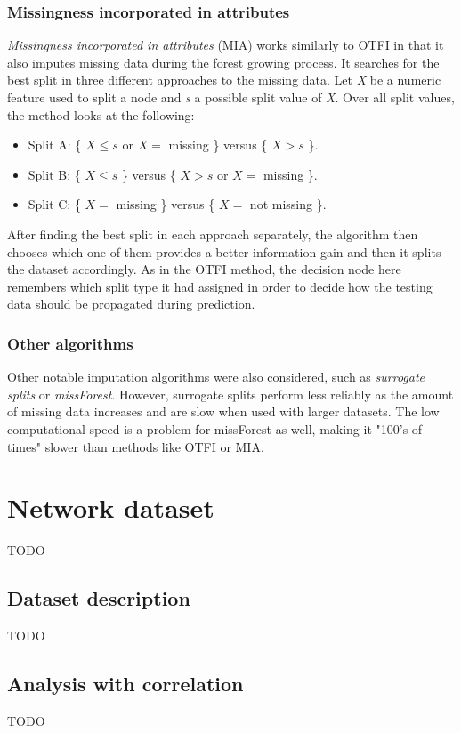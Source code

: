 \documentclass[11pt]{article}
\begin{document}
      \subsubsection{Missingness incorporated in attributes}
        \label{sec:mia}
        {\it Missingness incorporated in attributes}\cite{mia} (MIA) works similarly to OTFI in that it also imputes missing data during the forest growing process. It searches for the best split in three different approaches to the missing data. Let {\it X} be a numeric feature used to split a node and {\it s} a possible split value of {\it X}. Over all split values, the method looks at the following:
        \begin{itemize}
        \item Split A: \{ $X \leq s$ or $X =$ missing \} versus \{ $X > s$ \}.
        \item Split B: \{ $X \leq s$ \} versus \{ $X > s$ or $X =$ missing \}.
        \item Split C: \{ $X =$ missing \} versus \{ $X =$ not missing \}.
        \end{itemize}
        After finding the best split in each approach separately, the algorithm then chooses which one of them provides a better information gain and then it splits the dataset accordingly. As in the OTFI method, the decision node here remembers which split type it had assigned in order to decide how the testing data should be propagated during prediction.
      \subsubsection{Other algorithms}
        Other notable imputation algorithms were also considered, such as {\it surrogate splits}\cite{splits} or {\it missForest}\cite{otfi}. However, surrogate splits perform less reliably as the amount of missing data increases\cite{splits} and are slow when used with larger datasets.\cite{rsf} The low computational speed is a problem for missForest as well, making it "100's of times" slower than methods like OTFI or MIA.\cite{otfi}
  \section{Network dataset}
    {\color{red}TODO}
    \subsection{Dataset description}
      {\color{red}TODO}
    \subsection{Analysis with correlation}
      {\color{red}TODO}
\end{document}
